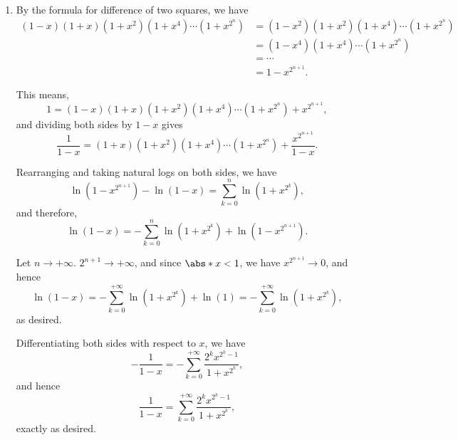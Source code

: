 \Question{\currfilebase}

\begin{enumerate}
    \item By the formula for difference of two squares, we have
          \begin{align*}
              (1 - x)(1 + x)(1 + x^2)(1 + x^4) \cdots (1 + x^{2^n}) & = (1 - x^2)(1 + x^2)(1 + x^4) \cdots (1 + x^{2^n}) \\
                                                                    & = (1 - x^4)(1 + x^4) \cdots (1 + x^{2^n})          \\
                                                                    & = \cdots                                           \\
                                                                    & = 1 - x^{2^{n + 1}}.
          \end{align*}

          This means,
          \[
              1 = (1 - x)(1 + x)(1 + x^2)(1 + x^4) \cdots (1 + x^{2^n}) + x^{2^{n + 1}},
          \]
          and dividing both sides by \(1 - x\) gives
          \[
              \frac{1}{1 - x} = (1 + x)(1 + x^2)(1 + x^4) \cdots (1 + x^{2^n}) + \frac{x^{2^{n + 1}}}{1 - x}.
          \]

          Rearranging and taking natural logs on both sides, we have
          \[
              \ln(1 - x^{2^{n + 1}}) - \ln(1 - x) = \sum_{k = 0}^{n} \ln(1 + x^{2^{k}}),
          \]
          and therefore,
          \[
              \ln(1 - x) = -\sum_{k = 0}^{n} \ln(1 + x^{2^{k}}) + \ln(1 - x^{2^{n + 1}}).
          \]

          Let \(n \to +\infty\). \(2^{n + 1} \to +\infty\), and since \(\abs*{x} < 1\), we have \(x^{2^{n + 1}} \to 0\), and hence
          \[
              \ln(1 - x) = -\sum_{k = 0}^{+\infty} \ln(1 + x^{2^{k}}) + \ln(1) = -\sum_{k = 0}^{+\infty} \ln(1 + x^{2^{k}}),
          \]
          as desired.

          Differentiating both sides with respect to \(x\), we have
          \[
              - \frac{1}{1 - x} = - \sum_{k = 0}^{+\infty} \frac{2^k x^{2^k - 1}}{1 + x^{2^k}},
          \]
          and hence
          \[
              \frac{1}{1 - x} = \sum_{k = 0}^{+\infty} \frac{2^k x^{2^k - 1}}{1 + x^{2^k}},
          \]
          exactly as desired.


\end{enumerate}
